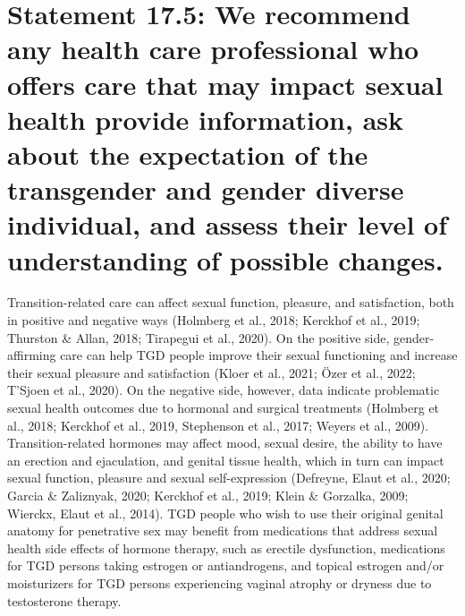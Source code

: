 \documentclass[
]{book}
\begin{document}
\hypertarget{statement-17.5-we-recommend-any-health-care-professional-who-offers-care-that-may-impact-sexual-health-provide-information-ask-about-the-expectation-of-the-transgender-and-gender-diverse-individual-and-assess-their-level-of-understanding-of-possible-changes.}{%
\section*{Statement 17.5: We recommend any health care professional who offers care that may impact sexual health provide information, ask about the expectation of the transgender and gender diverse individual, and assess their level of understanding of possible changes.}\label{statement-17.5-we-recommend-any-health-care-professional-who-offers-care-that-may-impact-sexual-health-provide-information-ask-about-the-expectation-of-the-transgender-and-gender-diverse-individual-and-assess-their-level-of-understanding-of-possible-changes.}}

Transition-related care can affect sexual function, pleasure, and satisfaction, both in positive
and negative ways (Holmberg et al., 2018;
Kerckhof et al., 2019; Thurston \& Allan, 2018;
Tirapegui et al., 2020). On the positive side,
gender-affirming care can help TGD people
improve their sexual functioning and increase
their sexual pleasure and satisfaction (Kloer et al.,
2021; Özer et al., 2022; T'Sjoen et al., 2020). On
the negative side, however, data indicate problematic sexual health outcomes due to hormonal
and surgical treatments (Holmberg et al., 2018;
Kerckhof et al., 2019, Stephenson et al., 2017;
Weyers et al., 2009). Transition-related hormones
may affect mood, sexual desire, the ability to
have an erection and ejaculation, and genital tissue health, which in turn can impact sexual function, pleasure and sexual self-expression
(Defreyne, Elaut et al., 2020; Garcia \& Zaliznyak,
2020; Kerckhof et al., 2019; Klein \& Gorzalka,
2009; Wierckx, Elaut et al., 2014). TGD people
who wish to use their original genital anatomy
for penetrative sex may benefit from medications
that address sexual health side effects of hormone
therapy, such as erectile dysfunction, medications
for TGD persons taking estrogen or antiandrogens, and topical estrogen and/or moisturizers
for TGD persons experiencing vaginal atrophy or
dryness due to testosterone therapy.
\end{document}
